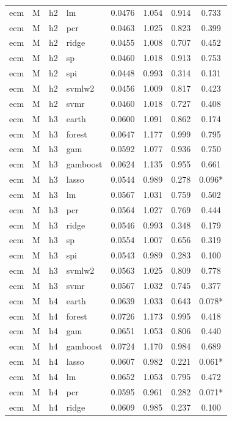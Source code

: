 \begin{ThreePartTable}
\begin{longtable}[t]{llclcccc}
ecm & M & h2 & lm & 0.0476 & 1.054 & 0.914 & 0.733\\
ecm & M & h2 & pcr & 0.0463 & 1.025 & 0.823 & 0.399\\
ecm & M & h2 & ridge & 0.0455 & 1.008 & 0.707 & 0.452\\
ecm & M & h2 & sp & 0.0460 & 1.018 & 0.913 & 0.753\\
ecm & M & h2 & spi & 0.0448 & 0.993 & 0.314 & 0.131\\
ecm & M & h2 & svmlw2 & 0.0456 & 1.009 & 0.817 & 0.423\\
ecm & M & h2 & svmr & 0.0460 & 1.018 & 0.727 & 0.408\\
\addlinespace
ecm & M & h3 & earth & 0.0600 & 1.091 & 0.862 & 0.174\\
ecm & M & h3 & forest & 0.0647 & 1.177 & 0.999 & 0.795\\
ecm & M & h3 & gam & 0.0592 & 1.077 & 0.936 & 0.750\\
ecm & M & h3 & gamboost & 0.0624 & 1.135 & 0.955 & 0.661\\
ecm & M & h3 & lasso & 0.0544 & 0.989 & 0.278 & 0.096*\\
ecm & M & h3 & lm & 0.0567 & 1.031 & 0.759 & 0.502\\
ecm & M & h3 & pcr & 0.0564 & 1.027 & 0.769 & 0.444\\
ecm & M & h3 & ridge & 0.0546 & 0.993 & 0.348 & 0.179\\
ecm & M & h3 & sp & 0.0554 & 1.007 & 0.656 & 0.319\\
ecm & M & h3 & spi & 0.0543 & 0.989 & 0.283 & 0.100\\
ecm & M & h3 & svmlw2 & 0.0563 & 1.025 & 0.809 & 0.778\\
ecm & M & h3 & svmr & 0.0567 & 1.032 & 0.745 & 0.377\\
\addlinespace
ecm & M & h4 & earth & 0.0639 & 1.033 & 0.643 & 0.078*\\
ecm & M & h4 & forest & 0.0726 & 1.173 & 0.995 & 0.418\\
ecm & M & h4 & gam & 0.0651 & 1.053 & 0.806 & 0.440\\
ecm & M & h4 & gamboost & 0.0724 & 1.170 & 0.984 & 0.689\\
ecm & M & h4 & lasso & 0.0607 & 0.982 & 0.221 & 0.061*\\
ecm & M & h4 & lm & 0.0652 & 1.053 & 0.795 & 0.472\\
ecm & M & h4 & pcr & 0.0595 & 0.961 & 0.282 & 0.071*\\
ecm & M & h4 & ridge & 0.0609 & 0.985 & 0.237 & 0.100\\

\end{longtable}
\end{ThreePartTable}
